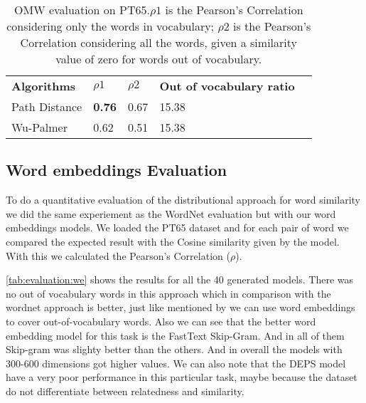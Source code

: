 \begin{table}[h]
    \caption{OMW evaluation on PT65.\textbf{$\rho1$} is the Pearson’s Correlation considering only the words in vocabulary; \textbf{$\rho2$} is the Pearson’s Correlation considering all the words, given a similarity value of zero for words out of vocabulary. }
    \label{tab:worneteval}
    \centering%
    \begin{minipage}{.8\textwidth}
    \begin{tabular}{@{}lllll@{}}
    \cmidrule(r){1-5}
    \textbf{Algorithms} & \textbf{$\rho1$} & \textbf{$\rho2$}         & \textbf{Out of vocabulary ratio} \\ 
    \cmidrule(r){1-4}
    Path Distance & \textbf{0.76} & 0.67   & 15.38                   \\
    Wu-Palmer     & 0.62    & 0.51         & 15.38                   \\ \cmidrule(r){1-4}
    \end{tabular}
    \end{minipage}
\end{table}









\subsection{Word embeddings Evaluation}\label{chap:results:we}

To do a quantitative evaluation of the distributional approach for word similarity we did the same experiement as the WordNet evaluation but with our word embeddings models.
We loaded the PT65 dataset and for each pair of word we compared the expected result with the Cosine similarity given by the model. With this we calculated the Pearson’s Correlation ($\rho$).

\autoref{tab:evaluation:we} shows the results for all the 40 generated models. There was no out of vocabulary words in this approach which in comparison with the wordnet approach is better, just like mentioned by  we can use word embeddings to cover out-of-vocabulary words. Also we can see that the better word embedding model for this task is the FastText Skip-Gram. And in all of them Skip-gram was slighty better than the others. And in overall the models with 300-600 dimensions got higher values. We can also note that the DEPS model have a very poor performance in this particular task, maybe because the dataset do not differentiate between relatedness and similarity.

